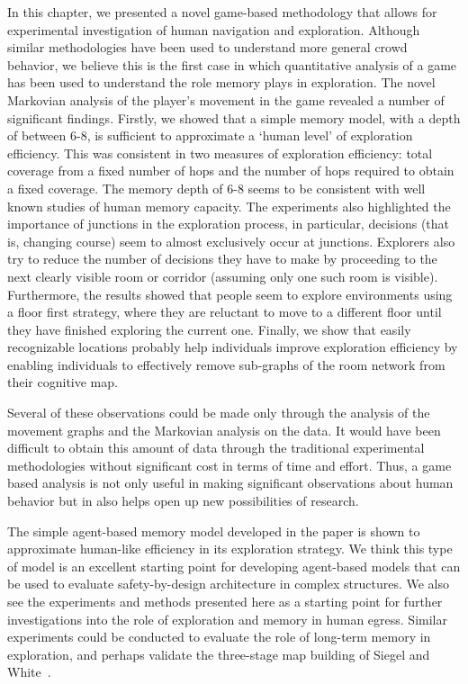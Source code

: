 In this chapter, we presented a novel game-based methodology that allows for experimental investigation of human navigation and exploration. Although similar methodologies have been used to understand more general crowd behavior, we believe this is the first case in which quantitative analysis of a game has been used to understand the role memory plays in exploration. The novel Markovian analysis of the player's movement in the game revealed a number of significant findings. Firstly, we showed that a simple memory model, with a depth of between 6-8, is sufficient to approximate a `human level' of exploration efficiency. This was consistent in two measures of exploration efficiency: total coverage from a fixed number of hops and the number of hops required to obtain a fixed coverage. The memory depth of 6-8 seems to be consistent with well known studies of human memory capacity. The experiments also highlighted the importance of junctions in the exploration process, in particular, decisions (that is, changing course) seem to almost exclusively occur at junctions. Explorers also try to reduce the number of decisions they have to make by proceeding to the next clearly visible room or corridor (assuming only one such room is visible). Furthermore, the results showed that people seem to explore environments using a floor first strategy, where they are reluctant to move to a different floor until they have finished exploring the current one. Finally, we show that easily recognizable locations probably help individuals improve exploration efficiency by enabling individuals to effectively remove sub-graphs of the room network from their cognitive map.

Several of these observations could be made only through the analysis of the movement graphs and the Markovian analysis on the data. It would have been difficult to obtain this amount of data through the traditional experimental methodologies without significant cost in terms of time and effort. Thus, a game based analysis is not only useful in making significant observations about human behavior but in also helps open up new possibilities of research.

The simple agent-based memory model developed in the paper is shown to approximate human-like efficiency in its exploration strategy. We think this type of model is an excellent starting point for developing agent-based models that can be used to evaluate safety-by-design architecture in complex structures. We also see the experiments and methods presented here as a starting point for further investigations into the role of exploration and memory in human egress. Similar experiments could be conducted to evaluate the role of long-term memory in exploration, and perhaps validate the three-stage map building of Siegel and White~\cite{Siegel19759}.



